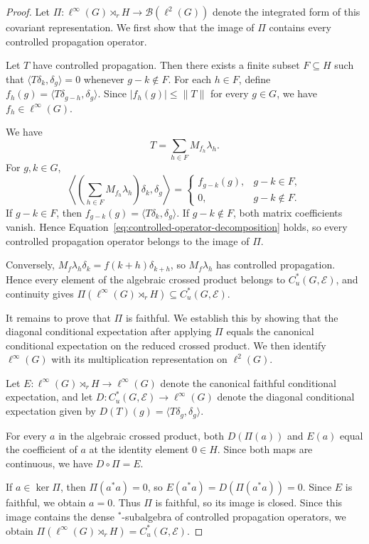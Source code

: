 \documentclass[pdflatex,sn-mathphys-num]{sn-jnl}%
\theoremstyle{plain}
\theoremstyle{remark}
\theoremstyle{definition}
\numberwithin{equation}{section}
\begin{document}
\begin{proof}
Let \( \Pi:\ell^\infty(G)\rtimes_rH\to\mathcal B(\ell^2(G)) \) denote the integrated form of this covariant representation. We first show that the image of \( \Pi \) contains every controlled propagation operator.

Let \( T \) have controlled propagation. Then there exists a finite subset \( F\subseteq H \) such that \( \langle T\delta_k,\delta_g\rangle=0 \) whenever \( g-k\notin F \). For each \( h\in F \), define \( f_h(g)=\langle T\delta_{g-h},\delta_g\rangle \). Since \( |f_h(g)|\le\|T\| \) for every \( g\in G \), we have \( f_h\in\ell^\infty(G) \).

We have
\begin{equation}
\label{eq:controlled-operator-decomposition}
T=\sum_{h\in F}M_{f_h}\lambda_h.
\end{equation}
For \( g,k\in G \),
\[
\left\langle
\left(\sum_{h\in F}M_{f_h}\lambda_h\right)\delta_k,
\delta_g
\right\rangle
=
\begin{cases}
f_{g-k}(g), & g-k\in F,\\
0, & g-k\notin F.
\end{cases}
\]
If \( g-k\in F \), then \( f_{g-k}(g)=\langle T\delta_k,\delta_g\rangle \). If \( g-k\notin F \), both matrix coefficients vanish. Hence Equation~\eqref{eq:controlled-operator-decomposition} holds, so every controlled propagation operator belongs to the image of \( \Pi \).

Conversely, \( M_f\lambda_h\delta_k=f(k+h)\delta_{k+h} \), so \( M_f\lambda_h \) has controlled propagation. Hence every element of the algebraic crossed product belongs to \( C_u^*(G,\mathcal E) \), and continuity gives \( \Pi(\ell^\infty(G)\rtimes_rH)\subseteq C_u^*(G,\mathcal E) \).

It remains to prove that \( \Pi \) is faithful. We establish this by showing that the diagonal conditional expectation after applying \( \Pi \) equals the canonical conditional expectation on the reduced crossed product. We then identify \( \ell^\infty(G) \) with its multiplication representation on \( \ell^2(G) \). 

Let \( E:\ell^\infty(G)\rtimes_rH\to\ell^\infty(G) \) denote the canonical faithful conditional expectation, and let \( D:C_u^*(G,\mathcal E)\to\ell^\infty(G) \) denote the diagonal conditional expectation given by \( D(T)(g)=\langle T\delta_g,\delta_g\rangle \).

For every \( a \) in the algebraic crossed product, both \( D(\Pi(a)) \) and \( E(a) \) equal the coefficient of \( a \) at the identity element \( 0\in H \). Since both maps are continuous, we have \( D\circ\Pi=E \).

If \( a\in\ker\Pi \), then \( \Pi(a^*a)=0 \), so \( E(a^*a)=D(\Pi(a^*a))=0 \). Since \( E \) is faithful, we obtain \( a=0 \). Thus \( \Pi \) is faithful, so its image is closed. Since this image contains the dense \( ^* \)-subalgebra of controlled propagation operators, we obtain \( \Pi(\ell^\infty(G)\rtimes_rH)=C_u^*(G,\mathcal E) \).
\end{proof}
\end{document}
